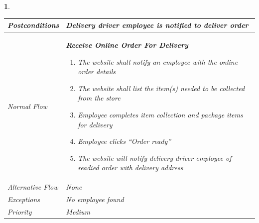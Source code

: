 \documentclass{scrreprt}
\theoremstyle{funreq}
\newtheorem{funreq}{}
\begin{document}
\begin{funreq}
\begin{table}[H]
{\begin{tabularx}{\columnwidth}{|l|X|}
					\\ \hline Postconditions   & 
					Delivery driver employee is notified to deliver order 
					\\ \hline Normal Flow &
					\bfseries{Receive Online Order For Delivery}\normalfont\newline 
					\begin{enumerate}
					    \item The website shall notify an employee with the online order details
					    \item The website shall list the item(s) needed to be collected from the store
                        \item Employee completes item collection and package items for delivery
                        \item Employee clicks “Order ready”
                        \item The website will notify delivery driver employee of readied order with delivery address
					\end{enumerate}
					\\ \hline Alternative Flow & 
					None
					\\ \hline Exceptions & 
					No employee found
					\\ \hline Priority & 
					Medium
					\\ \hline
				\end{tabularx}%
			}
		\end{table}
	\end{funreq}

\end{document}
